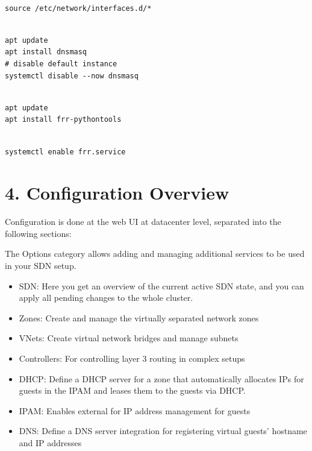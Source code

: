 \begin{lstlisting}

source /etc/network/interfaces.d/*

\end{lstlisting}

\begin{lstlisting}

apt update
apt install dnsmasq
# disable default instance
systemctl disable --now dnsmasq

\end{lstlisting}

\begin{lstlisting}

apt update
apt install frr-pythontools

\end{lstlisting}

\begin{lstlisting}

systemctl enable frr.service

\end{lstlisting}


\section{4. Configuration Overview}

Configuration is done at the web UI at datacenter level, separated into the following sections:

The Options category allows adding and managing additional services to be used in your SDN setup.

\begin{itemize}[leftmargin=2cm]

	\item SDN: Here you get an overview of the current active SDN state, and you can apply all pending changes to the whole cluster.

	\item Zones: Create and manage the virtually separated network zones

	\item VNets: Create virtual network bridges and manage subnets

\end{itemize}

\begin{itemize}[leftmargin=2cm]

	\item Controllers: For controlling layer 3 routing in complex setups

	\item DHCP: Define a DHCP server for a zone that automatically allocates IPs for guests in the IPAM and leases them to the guests via DHCP.

	\item IPAM: Enables external for IP address management for guests

	\item DNS: Define a DNS server integration for registering virtual guests' hostname and IP addresses

\end{itemize}


